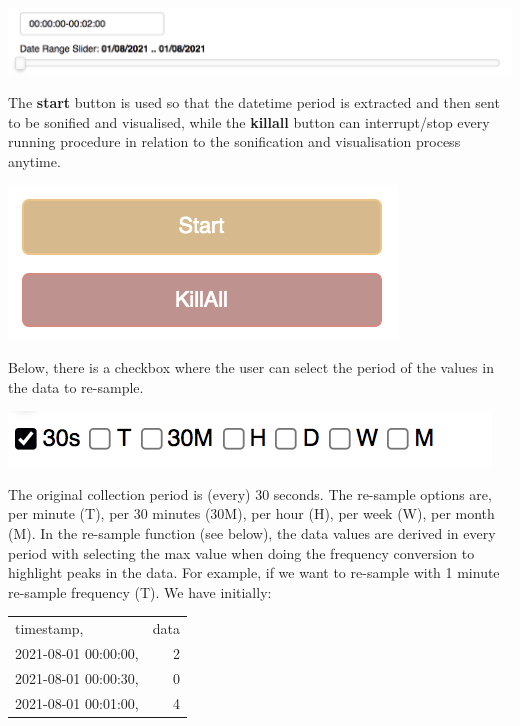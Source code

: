 \documentclass[11pt]{article}
\begin{document}
\begin{center}
\includegraphics[width=.9\linewidth]{./datetime_selection.png}
\end{center}

The \textbf{start} button is used so that the datetime period is extracted and then sent to be sonified and visualised, while the \textbf{killall} button can interrupt/stop every running procedure in relation to the sonification and visualisation process anytime.

\begin{center}
\includegraphics[width=.9\linewidth]{./start_kill_buttons.png}
\end{center}

Below, there is a checkbox where the user can select the period of the values in the data to re-sample.

\begin{center}
\includegraphics[width=.9\linewidth]{./resample_checkbox.png}
\end{center}

The original collection period is (every) 30 seconds.  The re-sample options are, per minute (T), per 30 minutes (30M), per hour (H), per week (W), per month (M).  In the re-sample function (see below), the data values are derived in every period with selecting the max value when doing the frequency conversion to highlight peaks in the data.  For example, if we want to re-sample with 1 minute re-sample frequency (T). We have initially:
\begin{center}
\begin{tabular}{lr}
\hline
timestamp, & data\\
2021-08-01 00:00:00, & 2\\
2021-08-01 00:00:30, & 0\\
2021-08-01 00:01:00, & 4\\
\hline
\end{tabular}
\end{center}
\end{document}
